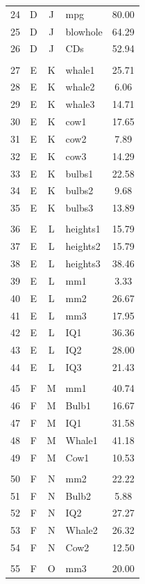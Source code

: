 \documentclass[12pt,nohyper]{tufte-handout}\usepackage[]{graphicx}\usepackage[]{color}
\begin{document}
\begin{longtable}{ccclc}
   24 & D & J & mpg & 80.00 \\ 
   25 & D & J & blowhole & 64.29 \\ 
   26 & D & J & CDs & 52.94 \\ 
   &  &  &  &  \\ 
   27 & E & K & whale1 & 25.71 \\ 
   28 & E & K & whale2 & 6.06 \\ 
   29 & E & K & whale3 & 14.71 \\ 
   30 & E & K & cow1 & 17.65 \\ 
   31 & E & K & cow2 & 7.89 \\ 
   32 & E & K & cow3 & 14.29 \\ 
   33 & E & K & bulbs1 & 22.58 \\ 
   34 & E & K & bulbs2 & 9.68 \\ 
   35 & E & K & bulbs3 & 13.89 \\ 
   &  &  &  &  \\ 
   36 & E & L & heights1 & 15.79 \\ 
   37 & E & L & heights2 & 15.79 \\ 
   38 & E & L & heights3 & 38.46 \\ 
   39 & E & L & mm1 & 3.33 \\ 
   40 & E & L & mm2 & 26.67 \\ 
   41 & E & L & mm3 & 17.95 \\ 
   42 & E & L & IQ1 & 36.36 \\ 
   43 & E & L & IQ2 & 28.00 \\ 
   44 & E & L & IQ3 & 21.43 \\ 
   &  &  &  &  \\ 
   45 & F & M & mm1 & 40.74 \\ 
   46 & F & M & Bulb1 & 16.67 \\ 
   47 & F & M & IQ1 & 31.58 \\ 
   48 & F & M & Whale1 & 41.18 \\ 
   49 & F & M & Cow1 & 10.53 \\ 
   &  &  &  &  \\ 
   50 & F & N & mm2 & 22.22 \\ 
   51 & F & N & Bulb2 & 5.88 \\ 
   52 & F & N & IQ2 & 27.27 \\ 
   53 & F & N & Whale2 & 26.32 \\ 
   54 & F & N & Cow2 & 12.50 \\ 
   &  &  &  &  \\ 
   55 & F & O & mm3 & 20.00 \\ 

\end{longtable}
\end{document}
